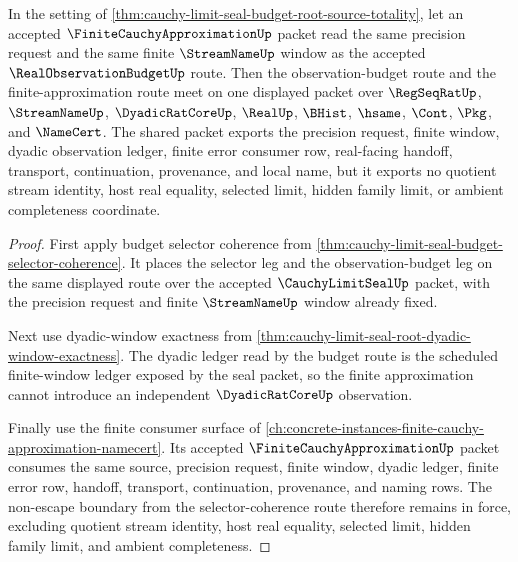 \begin{theorem}
\label{thm:cauchy-limit-seal-budget-approximation-route}
In the setting of \autoref{thm:cauchy-limit-seal-budget-root-source-totality}, let an accepted $\FiniteCauchyApproximationUp$ packet read the same precision request and the same finite $\StreamNameUp$ window as the accepted $\RealObservationBudgetUp$ route. Then the observation-budget route and the finite-approximation route meet on one displayed packet over $\RegSeqRatUp$, $\StreamNameUp$, $\DyadicRatCoreUp$, $\RealUp$, $\BHist$, $\hsame$, $\Cont$, $\Pkg$, and $\NameCert$. The shared packet exports the precision request, finite window, dyadic observation ledger, finite error consumer row, real-facing handoff, transport, continuation, provenance, and local name, but it exports no quotient stream identity, host real equality, selected limit, hidden family limit, or ambient completeness coordinate.
\end{theorem}
\begin{proof}
First apply budget selector coherence from \autoref{thm:cauchy-limit-seal-budget-selector-coherence}. It places the selector leg and the observation-budget leg on the same displayed route over the accepted $\CauchyLimitSealUp$ packet, with the precision request and finite $\StreamNameUp$ window already fixed.

Next use dyadic-window exactness from \autoref{thm:cauchy-limit-seal-root-dyadic-window-exactness}. The dyadic ledger read by the budget route is the scheduled finite-window ledger exposed by the seal packet, so the finite approximation cannot introduce an independent $\DyadicRatCoreUp$ observation.

Finally use the finite consumer surface of \autoref{ch:concrete-instances-finite-cauchy-approximation-namecert}. Its accepted $\FiniteCauchyApproximationUp$ packet consumes the same source, precision request, finite window, dyadic ledger, finite error row, handoff, transport, continuation, provenance, and naming rows. The non-escape boundary from the selector-coherence route therefore remains in force, excluding quotient stream identity, host real equality, selected limit, hidden family limit, and ambient completeness.
\end{proof}

